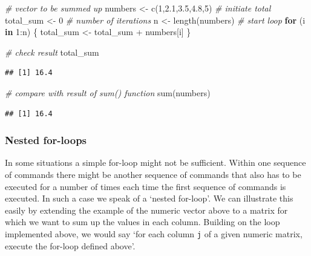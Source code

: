 \documentclass[
  12pt,
]{style/krantz}
\newenvironment{Shaded}{\begin{snugshade}}{\end{snugshade}}
\newcommand{\CommentTok}[1]{\textcolor[rgb]{0.56,0.35,0.01}{\textit{#1}}}
\newcommand{\ControlFlowTok}[1]{\textcolor[rgb]{0.13,0.29,0.53}{\textbf{#1}}}
\newcommand{\DecValTok}[1]{\textcolor[rgb]{0.00,0.00,0.81}{#1}}
\newcommand{\FloatTok}[1]{\textcolor[rgb]{0.00,0.00,0.81}{#1}}
\newcommand{\FunctionTok}[1]{\textcolor[rgb]{0.00,0.00,0.00}{#1}}
\newcommand{\NormalTok}[1]{#1}
\newcommand{\OtherTok}[1]{\textcolor[rgb]{0.56,0.35,0.01}{#1}}
\newcommand{\SpecialCharTok}[1]{\textcolor[rgb]{0.00,0.00,0.00}{#1}}
\begin{document}
\begin{Shaded}
\begin{Highlighting}[]
\CommentTok{\# vector to be summed up}
\NormalTok{numbers }\OtherTok{\textless{}{-}} \FunctionTok{c}\NormalTok{(}\DecValTok{1}\NormalTok{,}\FloatTok{2.1}\NormalTok{,}\FloatTok{3.5}\NormalTok{,}\FloatTok{4.8}\NormalTok{,}\DecValTok{5}\NormalTok{)}
\CommentTok{\# initiate total}
\NormalTok{total\_sum }\OtherTok{\textless{}{-}} \DecValTok{0}
\CommentTok{\# number of iterations}
\NormalTok{n }\OtherTok{\textless{}{-}} \FunctionTok{length}\NormalTok{(numbers)}
\CommentTok{\# start loop}
\ControlFlowTok{for}\NormalTok{ (i }\ControlFlowTok{in} \DecValTok{1}\SpecialCharTok{:}\NormalTok{n) \{}
\NormalTok{     total\_sum }\OtherTok{\textless{}{-}}\NormalTok{ total\_sum }\SpecialCharTok{+}\NormalTok{ numbers[i]}
\NormalTok{\}}

\CommentTok{\# check result}
\NormalTok{total\_sum}
\end{Highlighting}
\end{Shaded}

\begin{verbatim}
## [1] 16.4
\end{verbatim}

\begin{Shaded}
\begin{Highlighting}[]
\CommentTok{\# compare with result of sum() function}
\FunctionTok{sum}\NormalTok{(numbers)}
\end{Highlighting}
\end{Shaded}

\begin{verbatim}
## [1] 16.4
\end{verbatim}

\hypertarget{nested-for-loops}{%
\subsubsection{Nested for-loops}\label{nested-for-loops}}

In some situations a simple for-loop might not be sufficient. Within one sequence of commands there might be another sequence of commands that also has to be executed for a number of times each time the first sequence of commands is executed. In such a case we speak of a `nested for-loop'. We can illustrate this easily by extending the example of the numeric vector above to a matrix for which we want to sum up the values in each column. Building on the loop implemented above, we would say `for each column \texttt{j} of a given numeric matrix, execute the for-loop defined above'.
\end{document}
